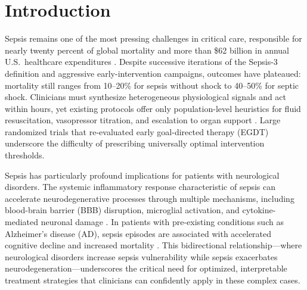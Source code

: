 
\section{Introduction}\label{sec:intro}

Sepsis remains one of the most pressing challenges in critical care, responsible for nearly twenty percent of global mortality and more than \$62 billion in annual U.S.\ healthcare expenditures \citep{rudd2020sepsis, fleischmann2016sepsis}. Despite successive iterations of the Sepsis-3 definition \citep{singer2016sepsis3} and aggressive early-intervention campaigns, outcomes have plateaued: mortality still ranges from 10--20\% for sepsis without shock to 40--50\% for septic shock. Clinicians must synthesize heterogeneous physiological signals and act within hours, yet existing protocols offer only population-level heuristics for fluid resuscitation, vasopressor titration, and escalation to organ support \citep{rhodes2017ssc}. Large randomized trials that re-evaluated early goal-directed therapy (EGDT) \citep{rivers2001egdt, arise2014} underscore the difficulty of prescribing universally optimal intervention thresholds.

Sepsis has particularly profound implications for patients with neurological disorders. The systemic inflammatory response characteristic of sepsis can accelerate neurodegenerative processes through multiple mechanisms, including blood-brain barrier (BBB) disruption, microglial activation, and cytokine-mediated neuronal damage \citep{nwafor2019bbb_targeting, barichello2013oxidative_sepsis}. In patients with pre-existing conditions such as Alzheimer's disease (AD), sepsis episodes are associated with accelerated cognitive decline and increased mortality \citep{guerra2012dementia_risk_icu}. This bidirectional relationship—where neurological disorders increase sepsis vulnerability while sepsis exacerbates neurodegeneration—underscores the critical need for optimized, interpretable treatment strategies that clinicians can confidently apply in these complex cases.

